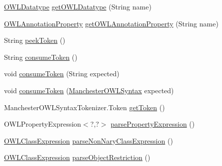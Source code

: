 \begin{DoxyCompactItemize}
\hyperlink{interfaceorg_1_1semanticweb_1_1owlapi_1_1model_1_1_o_w_l_datatype}{O\-W\-L\-Datatype} \hyperlink{classorg_1_1coode_1_1owlapi_1_1manchesterowlsyntax_1_1_manchester_o_w_l_syntax_editor_parser_a4f2327cf45529ca1c105ffc3851bdd53}{get\-O\-W\-L\-Datatype} (String name)
\item 
\hyperlink{interfaceorg_1_1semanticweb_1_1owlapi_1_1model_1_1_o_w_l_annotation_property}{O\-W\-L\-Annotation\-Property} \hyperlink{classorg_1_1coode_1_1owlapi_1_1manchesterowlsyntax_1_1_manchester_o_w_l_syntax_editor_parser_a17d6162c3f4c51be33245201aca91685}{get\-O\-W\-L\-Annotation\-Property} (String name)
\item 
String \hyperlink{classorg_1_1coode_1_1owlapi_1_1manchesterowlsyntax_1_1_manchester_o_w_l_syntax_editor_parser_a24fd9b4c4d3a13206618cc21f28e1e71}{peek\-Token} ()
\item 
String \hyperlink{classorg_1_1coode_1_1owlapi_1_1manchesterowlsyntax_1_1_manchester_o_w_l_syntax_editor_parser_aeb9a56dc55e8c278dcef88009d1e3ec9}{consume\-Token} ()
\item 
void \hyperlink{classorg_1_1coode_1_1owlapi_1_1manchesterowlsyntax_1_1_manchester_o_w_l_syntax_editor_parser_a9632606036245d218532eaa96056c449}{consume\-Token} (String expected)
\item 
void \hyperlink{classorg_1_1coode_1_1owlapi_1_1manchesterowlsyntax_1_1_manchester_o_w_l_syntax_editor_parser_affd465b6463aad0bc6ac689ad459155d}{consume\-Token} (\hyperlink{enumorg_1_1coode_1_1owlapi_1_1manchesterowlsyntax_1_1_manchester_o_w_l_syntax}{Manchester\-O\-W\-L\-Syntax} expected)
\item 
Manchester\-O\-W\-L\-Syntax\-Tokenizer.\-Token \hyperlink{classorg_1_1coode_1_1owlapi_1_1manchesterowlsyntax_1_1_manchester_o_w_l_syntax_editor_parser_a8f24b2d95965b9a1ca8a799e37eb2048}{get\-Token} ()
\item 
O\-W\-L\-Property\-Expression$<$?,?$>$ \hyperlink{classorg_1_1coode_1_1owlapi_1_1manchesterowlsyntax_1_1_manchester_o_w_l_syntax_editor_parser_a13bda981bfcf130451fc8ffde17426a2}{parse\-Property\-Expression} ()
\item 
\hyperlink{interfaceorg_1_1semanticweb_1_1owlapi_1_1model_1_1_o_w_l_class_expression}{O\-W\-L\-Class\-Expression} \hyperlink{classorg_1_1coode_1_1owlapi_1_1manchesterowlsyntax_1_1_manchester_o_w_l_syntax_editor_parser_aa6a923394b6a170d179213af4843d6d1}{parse\-Non\-Nary\-Class\-Expression} ()
\item 
\hyperlink{interfaceorg_1_1semanticweb_1_1owlapi_1_1model_1_1_o_w_l_class_expression}{O\-W\-L\-Class\-Expression} \hyperlink{classorg_1_1coode_1_1owlapi_1_1manchesterowlsyntax_1_1_manchester_o_w_l_syntax_editor_parser_a5efad2b54ad51b6ecf9a0706e4ee192b}{parse\-Object\-Restriction} ()

\end{DoxyCompactItemize}
